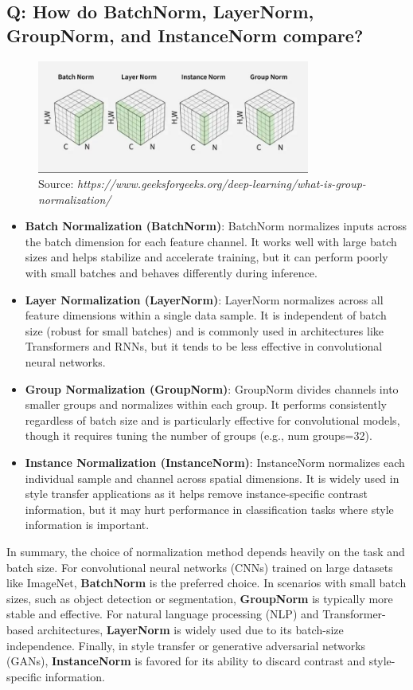 \documentclass[11pt]{article}
\begin{document}
\subsection*{Q: How do BatchNorm, LayerNorm, GroupNorm, and InstanceNorm compare?}
\begin{figure}[H]
	\centering
	\includegraphics[width=0.8\textwidth]{norms.jpg}
	\caption{Source: \textit{https://www.geeksforgeeks.org/deep-learning/what-is-group-normalization/}}
\end{figure}
\begin{itemize}
	\item \textbf{Batch Normalization (BatchNorm)}: BatchNorm normalizes inputs across the batch dimension for each feature channel. It works well with large batch sizes and helps stabilize and accelerate training, but it can perform poorly with small batches and behaves differently during inference.
	\item \textbf{Layer Normalization (LayerNorm)}: LayerNorm normalizes across all feature dimensions within a single data sample. It is independent of batch size (robust for small batches) and is commonly used in architectures like Transformers and RNNs, but it tends to be less effective in convolutional neural networks.
	\item \textbf{Group Normalization (GroupNorm)}: GroupNorm divides channels into smaller groups and normalizes within each group. It performs consistently regardless of batch size and is particularly effective for convolutional models, though it requires tuning the number of groups (e.g., num groups=32).
	\item \textbf{Instance Normalization (InstanceNorm)}: InstanceNorm normalizes each individual sample and channel across spatial dimensions. It is widely used in style transfer applications as it helps remove instance-specific contrast information, but it may hurt performance in classification tasks where style information is important.
\end{itemize}

In summary, the choice of normalization method depends heavily on the task and batch size. For convolutional neural networks (CNNs) trained on large datasets like ImageNet, \textbf{BatchNorm} is the preferred choice. In scenarios with small batch sizes, such as object detection or segmentation, \textbf{GroupNorm} is typically more stable and effective. For natural language processing (NLP) and Transformer-based architectures, \textbf{LayerNorm} is widely used due to its batch-size independence. Finally, in style transfer or generative adversarial networks (GANs), \textbf{InstanceNorm} is favored for its ability to discard contrast and style-specific information.
\end{document}
